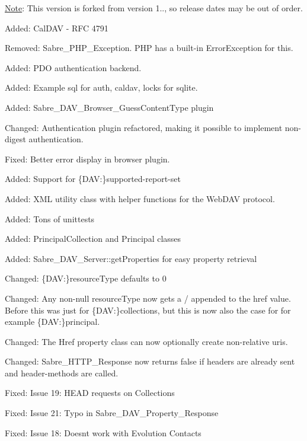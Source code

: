\begin{DoxyItemize}
\item \mbox{\hyperlink{class_note}{Note}}\+: This version is forked from version 1.., so release dates may be out of order.
\item Added\+: Cal\+D\+AV -\/ R\+FC 4791
\item Removed\+: Sabre\+\_\+\+P\+H\+P\+\_\+\+Exception. P\+HP has a built-\/in Error\+Exception for this.
\item Added\+: P\+DO authentication backend.
\item Added\+: Example sql for auth, caldav, locks for sqlite.
\item Added\+: Sabre\+\_\+\+D\+A\+V\+\_\+\+Browser\+\_\+\+Guess\+Content\+Type plugin
\item Changed\+: Authentication plugin refactored, making it possible to implement non-\/digest authentication.
\item Fixed\+: Better error display in browser plugin.
\item Added\+: Support for \{D\+AV\+:\}supported-\/report-\/set
\item Added\+: X\+ML utility class with helper functions for the Web\+D\+AV protocol.
\item Added\+: Tons of unittests
\item Added\+: Principal\+Collection and Principal classes
\item Added\+: Sabre\+\_\+\+D\+A\+V\+\_\+\+Server\+::get\+Properties for easy property retrieval
\item Changed\+: \{D\+AV\+:\}resource\+Type defaults to 0
\item Changed\+: Any non-\/null resource\+Type now gets a / appended to the href value. Before this was just for \{D\+AV\+:\}collection\textquotesingle{}s, but this is now also the case for for example \{D\+AV\+:\}principal.
\item Changed\+: The Href property class can now optionally create non-\/relative uri\textquotesingle{}s.
\item Changed\+: Sabre\+\_\+\+H\+T\+T\+P\+\_\+\+Response now returns false if headers are already sent and header-\/methods are called.
\item Fixed\+: Issue 19\+: H\+E\+AD requests on Collections
\item Fixed\+: Issue 21\+: Typo in Sabre\+\_\+\+D\+A\+V\+\_\+\+Property\+\_\+\+Response
\item Fixed\+: Issue 18\+: Doesn\textquotesingle{}t work with Evolution Contacts
\end{DoxyItemize}

